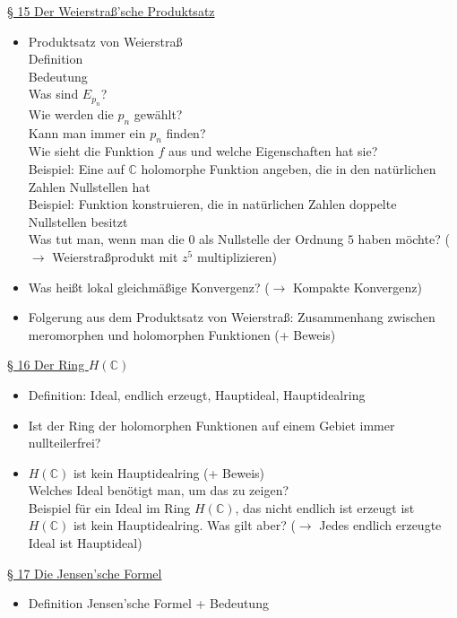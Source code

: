 \documentclass[11pt]{article}
\newcommand{\C}{\mathbb{C}}
\begin{document}
\underline{§ 15 Der Weierstraß'sche Produktsatz}
\vspace{-0.5cm}
\begin{itemize}
\item Produktsatz von Weierstraß \\
\quad Definition \\
\quad Bedeutung \\
\quad Was sind $E_{p_n}$? \\
\quad Wie werden die $p_n$ gewählt? \\
\quad Kann man immer ein $p_n$ finden? \\
\quad Wie sieht die Funktion $f$ aus und welche Eigenschaften hat sie? \\
\quad Beispiel: Eine auf $\C$ holomorphe Funktion angeben, die in den natürlichen Zahlen Nullstellen hat \\
\quad Beispiel: Funktion konstruieren, die in natürlichen Zahlen doppelte Nullstellen besitzt \\
\quad Was tut man, wenn man die $0$ als Nullstelle der Ordnung $5$ haben möchte? ($\rightarrow$ Weierstraßprodukt mit $z^5$ multiplizieren)
\item Was heißt lokal gleichmäßige Konvergenz? ($\rightarrow$ Kompakte Konvergenz)
\item Folgerung aus dem Produktsatz von Weierstraß: Zusammenhang zwischen meromorphen und holomorphen Funktionen (+ Beweis)
\end{itemize}

\underline{§ 16 Der Ring $H(\C)$}
\vspace{-0.5cm}
\begin{itemize}
\item Definition: Ideal, endlich erzeugt, Hauptideal, Hauptidealring
\item Ist der Ring der holomorphen Funktionen auf einem Gebiet immer nullteilerfrei?
\item $H(\C)$ ist kein Hauptidealring (+ Beweis) \\
\quad Welches Ideal benötigt man, um das zu zeigen? \\
\quad Beispiel für ein Ideal im Ring $H(\C)$, das nicht endlich ist erzeugt ist \\
\quad $H(\C)$ ist kein Hauptidealring. Was gilt aber? ($\rightarrow$ Jedes endlich erzeugte Ideal ist Hauptideal)
\end{itemize}

\underline{§ 17 Die Jensen'sche Formel}
\vspace{-0.5cm}
\begin{itemize}
\item Definition Jensen'sche Formel + Bedeutung
\end{itemize}
\end{document}
